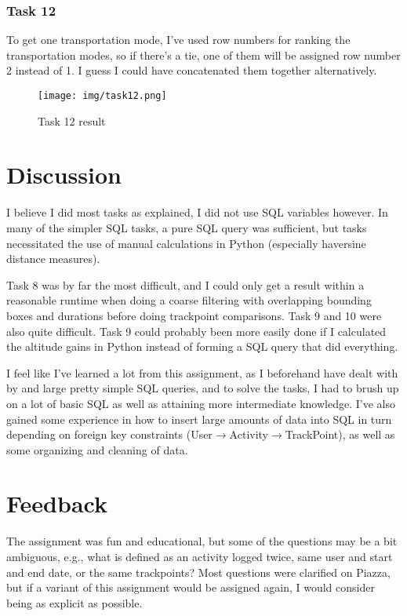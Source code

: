 \documentclass[12pt, titlepage]{report}
\begin{document}
\subsubsection*{Task 12}
To get one transportation mode, I've used row numbers for ranking the transportation modes, so if there's a tie, one of them will be assigned row number 2 instead of 1. I guess I could have concatenated them together alternatively.
\begin{figure}[H]
    \centering
    \texttt{[image: img/task12.png]}
    \caption{Task 12 result}
    \label{fig:my_label}
\end{figure}
\section*{Discussion}
I believe I did most tasks as explained, I did not use SQL variables however. In many of the simpler SQL tasks, a pure SQL query was sufficient, but tasks necessitated the use of manual calculations in Python (especially haversine distance measures). 

Task 8 was by far the most difficult, and I could only get a result within a reasonable runtime when doing a coarse filtering with overlapping bounding boxes and durations before doing trackpoint comparisons. Task 9 and 10 were also quite difficult. Task 9 could probably been more easily done if I calculated the altitude gains in Python instead of forming a SQL query that did everything.

I feel like I've learned a lot from this assignment, as I beforehand have dealt with by and large pretty simple SQL queries, and to solve the tasks, I had to brush up on a lot of basic SQL as well as attaining more intermediate knowledge. I've also gained some experience in how to insert large amounts of data into SQL in turn depending on foreign key constraints (User$\rightarrow$Activity$\rightarrow$TrackPoint), as well as some organizing and cleaning of data. 

\section*{Feedback}
The assignment was fun and educational, but some of the questions may be a bit ambiguous, e.g., what is defined as an activity logged twice, same user and start and end date, or the same trackpoints? Most questions were clarified on Piazza, but if a variant of this assignment would be assigned again, I would consider being as explicit as possible.
\end{document}
